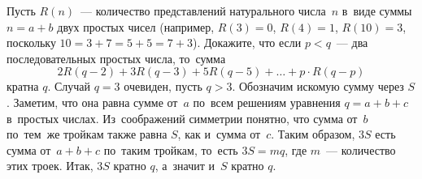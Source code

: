 \problem
Пусть $R(n)$~--- количество представлений натурального числа~$n$ в~виде суммы
$n = a + b$ двух простых чисел (например, $R(3) = 0$, $R(4) = 1$, $R(10) = 3$,
поскольку $10 = 3 + 7 = 5 + 5 = 7 + 3$).
Докажите, что если $p < q$~--- два последовательных простых числа, то~сумма
\[
    2 R (q - 2) + 3 R (q - 3) + 5 R (q - 5) + \ldots + p \cdot R (q - p)
\]
кратна $q$.
\solution
Случай $q = 3$ очевиден, пусть $q > 3$.
Обозначим искомую сумму через $S$.
Заметим, что она равна сумме от~$a$ по~всем решениям уравнения $q = a + b + c$
в~простых числах. 
Из~соображений симметрии понятно, что сумма от~$b$ по~тем~же тройкам также
равна $S$, как и~сумма от~$c$.
Таким образом, $3S$ есть сумма от~$a + b + c$ по~таким тройкам, 
то~есть $3 S = m q$, где $m$~--- количество этих троек.
Итак, $3 S$ кратно $q$, а~значит и~$S$ кратно $q$. 
\endproblem
